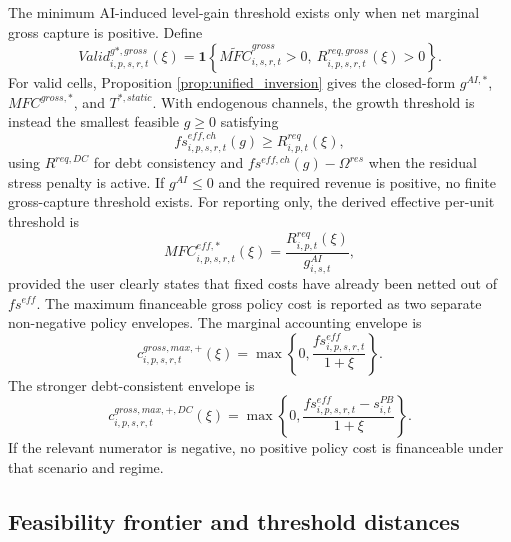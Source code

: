 \documentclass[11pt,a4paper]{article}
\begin{document}
The minimum AI-induced level-gain threshold exists only when net marginal gross capture is positive. Define
\begin{equation}\label{eq:valid_growth_threshold_v20}
    Valid^{g*,gross}_{i,p,s,r,t}(\xi)
    =\mathbf{1}\left\{\widetilde{MFC}^{gross}_{i,s,r,t}>0,\ R^{req,gross}_{i,p,s,r,t}(\xi)>0\right\}.
\end{equation}
For valid cells, Proposition \ref{prop:unified_inversion} gives the closed-form $g^{AI,*}$, $MFC^{gross,*}$, and $T^{*,static}$. With endogenous channels, the growth threshold is instead the smallest feasible $g\geq0$ satisfying
\begin{equation}\label{eq:gstar_channel_root_v24}
    fs^{eff,ch}_{i,p,s,r,t}(g)\geq R^{req}_{i,p,t}(\xi),
\end{equation}
using $R^{req,DC}$ for debt consistency and $fs^{eff,ch}(g)-\Omega^{res}$ when the residual stress penalty is active.
If $g^{AI}\leq0$ and the required revenue is positive, no finite gross-capture threshold exists. For reporting only, the derived effective per-unit threshold is
\begin{equation}\label{eq:mfcstar_eff_main_v17}
    MFC^{eff,*}_{i,p,s,r,t}(\xi)=\frac{R^{req}_{i,p,t}(\xi)}{g^{AI}_{i,s,t}},
\end{equation}
provided the user clearly states that fixed costs have already been netted out of $fs^{eff}$.
The maximum financeable gross policy cost is reported as two separate non-negative policy envelopes. The marginal accounting envelope is
\begin{equation}\label{eq:cmax_main_v17}
    c^{gross,max,+}_{i,p,s,r,t}(\xi)=\max\left\{0,\frac{fs^{eff}_{i,p,s,r,t}}{1+\xi}\right\}.
\end{equation}
The stronger debt-consistent envelope is
\begin{equation}\label{eq:cmax_dc_main_v22}
    c^{gross,max,+,DC}_{i,p,s,r,t}(\xi)=\max\left\{0,\frac{fs^{eff}_{i,p,s,r,t}-s^{PB}_{i,t}}{1+\xi}\right\}.
\end{equation}
If the relevant numerator is negative, no positive policy cost is financeable under that scenario and regime.

\subsection{Feasibility frontier and threshold distances}
\end{document}
